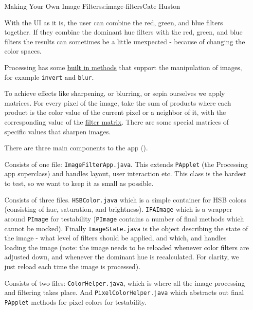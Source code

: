 \begin{aosachapter}{Making Your Own Image Filters}{s:image-filters}{Cate Huston}
\label{combining-filters}

With the UI as it is, the user can combine the red, green, and blue
filters together. If they combine the dominant hue filters with the red,
green, and blue filters the results can sometimes be a little unexpected
- because of changing the color spaces.

Processing has some
\href{https://www.processing.org/reference/filter_.html}{built in
methods} that support the manipulation of images, for example
\texttt{invert} and \texttt{blur}.

To achieve effects like sharpening, or blurring, or sepia ourselves we
apply matrices. For every pixel of the image, take the sum of products
where each product is the color value of the current pixel or a neighbor
of it, with the corresponding value of the
\href{http://lodev.org/cgtutor/filtering.html}{filter matrix}. There are
some special matrices of specific values that sharpen images.

\label{architecture}

There are three main components to the app
().

\label{the-app-1}

Consists of one file: \texttt{ImageFilterApp.java}. This extends
\texttt{PApplet} (the Processing app superclass) and handles layout,
user interaction etc. This class is the hardest to test, so we want to
keep it as small as possible.

\label{model}

Consists of three files. \texttt{HSBColor.java} which is a simple
container for HSB colors (consisting of hue, saturation, and
brightness). \texttt{IFAImage} which is a wrapper around \texttt{PImage}
for testability (\texttt{PImage} contains a number of final methods
which cannot be mocked). Finally \texttt{ImageState.java} is the object
describing the state of the image - what level of filters should be
applied, and which, and handles loading the image (note: the image needs
to be reloaded whenever color filters are adjusted down, and whenever
the dominant hue is recalculated. For clarity, we just reload each time
the image is processed).

\label{color-1}

Consists of two files: \texttt{ColorHelper.java}, which is where all the
image processing and filtering takes place. And
\texttt{PixelColorHelper.java} which abstracts out final
\texttt{PApplet} methods for pixel colors for testability.


\end{aosachapter}
